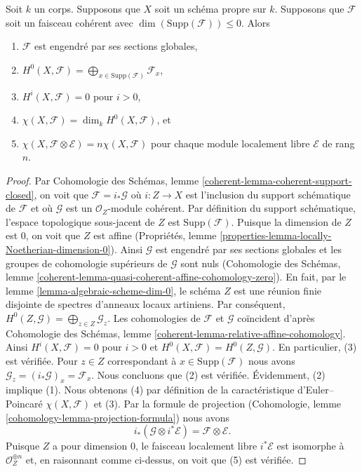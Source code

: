 \begin{lemma}
\label{lemma-chi-tensor-finite}
Soit $k$ un corps. Supposons que $X$ soit un
schéma propre sur $k$. Supposons que $\mathcal{F}$ soit un
faisceau cohérent avec $\dim(\text{Supp}(\mathcal{F})) \leq 0$. Alors
\begin{enumerate}
\item $\mathcal{F}$ est engendré par ses sections
globales, \item $H^0(X, \mathcal{F}) =
\bigoplus_{x \in \text{Supp}(\mathcal{F})}
\mathcal{F}_x$, \item $H^i(X, \mathcal{F}) = 0$ pour
$i > 0$, \item $\chi(X, \mathcal{F}) = \dim_k
H^0(X, \mathcal{F})$, et \item $\chi(X, \mathcal{F}
\otimes \mathcal{E}) = n\chi(X, \mathcal{F})$ pour
chaque module localement libre $\mathcal{E}$ de rang $n$.
\end{enumerate}
\end{lemma}

\begin{proof}
Par Cohomologie des Schémas, lemme
\ref{coherent-lemma-coherent-support-closed}, on voit que
$\mathcal{F} = i_*\mathcal{G}$ où $i : Z \to X$ est l'inclusion
du support schématique de $\mathcal{F}$ et où $\mathcal{G}$ est
un $\mathcal{O}_Z$-module cohérent. Par définition du support
schématique, l'espace topologique sous-jacent de $Z$ est
$\text{Supp}(\mathcal{F})$. Puisque la dimension de $Z$ est
$0$, on voit que $Z$ est affine (Propriétés, lemme
\ref{properties-lemma-locally-Noetherian-dimension-0}). Ainsi
$\mathcal{G}$ est engendré par ses sections globales et les groupes de
cohomologie supérieurs de $\mathcal{G}$ sont nuls (Cohomologie
des Schémas, lemme
\ref{coherent-lemma-quasi-coherent-affine-cohomology-zero}). En
fait, par le lemme \ref{lemma-algebraic-scheme-dim-0}, le schéma $Z$
est une réunion finie disjointe de spectres d'anneaux locaux
artiniens. Par conséquent, $H^0(Z, \mathcal{G}) =
\bigoplus_{z \in Z} \mathcal{G}_z$. Les cohomologies de $\mathcal{F}$
et $\mathcal{G}$ coïncident d'après Cohomologie des Schémas, lemme
\ref{coherent-lemma-relative-affine-cohomology}. Ainsi $H^i(X,
\mathcal{F}) = 0$ pour $i > 0$ et $H^0(X, \mathcal{F}) = H^0(Z,
\mathcal{G})$. En particulier, (3) est vérifiée. Pour $z \in Z$
correspondant à $x \in \text{Supp}(\mathcal{F})$ nous avons
$\mathcal{G}_z = (i_*\mathcal{G})_x = \mathcal{F}_x$. Nous concluons que (2)
est vérifiée. Évidemment, (2) implique (1). Nous obtenons (4) par définition de la
caractéristique d'Euler--Poincaré $\chi(X, \mathcal{F})$ et (3). Par la formule de
projection (Cohomologie, lemme \ref{cohomology-lemma-projection-formula}) nous avons
$$
i_*(\mathcal{G} \otimes i^*\mathcal{E}) = \mathcal{F} \otimes \mathcal{E}.
$$
Puisque $Z$ a pour dimension $0$, le faisceau localement
libre $i^*\mathcal{E}$ est isomorphe à $\mathcal{O}_Z^{\oplus
n}$ et, en raisonnant comme ci-dessus, on voit que (5) est vérifiée.
\end{proof}

